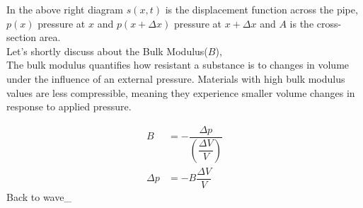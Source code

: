     In the above right diagram $s(x, t)$ is the displacement function across the pipe, $p(x)$ pressure at $x$ and $p(x+\Delta x)$ pressure at $x+\Delta x$ and $A$ is the cross-section area.\\
    
    Let's shortly discuss about the Bulk Modulus($B$),\\[2mm]
    The bulk modulus quantifies how resistant a substance is to changes in volume under the influence of an external pressure. Materials with high bulk modulus values are less compressible, meaning they experience smaller volume changes in response to applied pressure.
    \begin{center}
    \end{center}
    \begin{align*}
        B &= -\dfrac{\Delta p}{\left(\dfrac{\Delta V}{V}\right)}\\
        \Delta p &= -B\dfrac{\Delta V}{V}
    \end{align*}
    Back to wave\_
    \pagebreak

